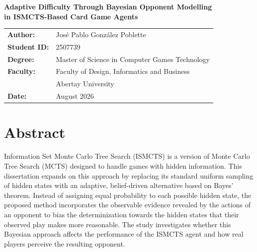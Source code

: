 \documentclass[12pt,a4paper,oneside]{report}
\begin{document}
\begin{titlepage}
    \centering

    \vspace*{\fill}

    {\Large\bfseries
    Adaptive Difficulty Through Bayesian Opponent Modelling\\[0.35cm]
    in ISMCTS-Based Card Game Agents\par}

    \vspace*{\fill}

   
    \begin{flushleft}
        \begin{tabular}{@{}ll}
            \textbf{Author:} & José Pablo González Poblette \\[0.2cm]
            \textbf{Student ID:} & 2507739 \\[0.2cm]
            \textbf{Degree:} & Master of Science in Computer Games Technology \\[0.2cm]
            \textbf{Faculty:} & Faculty of Design, Informatics and Business \\
            & Abertay University \\[0.2cm]
            \textbf{Date:} & August 2026
        \end{tabular}
    \end{flushleft}

    \vspace{1.2cm}

\end{titlepage}


\chapter*{Abstract}

 Information Set Monte Carlo Tree Search (ISMCTS) is a version of Monte Carlo Tree Search (MCTS) designed to handle games with hidden information. This dissertation expands on this approach by replacing its standard uniform sampling of hidden states with an adaptive, belief-driven alternative based on Bayes’ theorem. Instead of assigning equal probability to each possible hidden state, the proposed method incorporates the observable evidence revealed by the actions of an opponent to bias the determinization towards the hidden states that their observed play makes more reasonable. The study investigates whether this Bayesian approach affects the performance of the ISMCTS agent and how real players perceive the resulting opponent.
\end{document}
